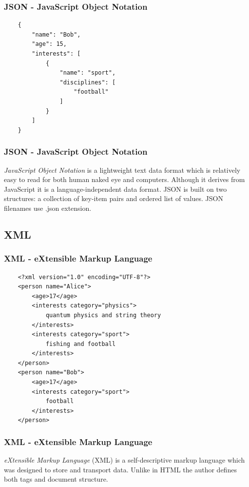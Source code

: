 \begin{frame}[fragile]
    \frametitle{JSON - JavaScript Object Notation}
    \begin{verbatim}
    {
        "name": "Bob",
        "age": 15,
        "interests": [
            {
                "name": "sport",
                "disciplines": [
                    "football"
                ]
            }
        ]
    }
    \end{verbatim}
    \end{frame}

\begin{frame}
    \frametitle{JSON - JavaScript Object Notation}
    \begin{definition}
        \emph{JavaScript Object Notation} is a lightweight text data format which is relatively easy to read for both human naked eye and computers. Although it derives from JavaScript it is a language-independent data format. JSON is built on two structures: a collection of key-item pairs and ordered list of values. JSON filenames use .json extension.
    \end{definition}
\end{frame}

\subsection{XML}

\begin{frame}[fragile]
    \frametitle{XML - eXtensible Markup Language}
    \begin{verbatim}
    <?xml version="1.0" encoding="UTF-8"?>
    <person name="Alice">
        <age>17</age>
        <interests category="physics">
            quantum physics and string theory
        </interests>
        <interests category="sport">
            fishing and football
        </interests>
    </person>
    <person name="Bob">
        <age>17</age>
        <interests category="sport">
            football
        </interests>
    </person>

    \end{verbatim}
\end{frame}

\begin{frame}
    \frametitle{XML - eXtensible Markup Language}
    \begin{definition}
        \emph{eXtensible Markup Language} (XML) is a self-descriptive markup language which was designed to store and transport data. Unlike in HTML the author defines both tags and document structure.
    \end{definition}
\end{frame}




